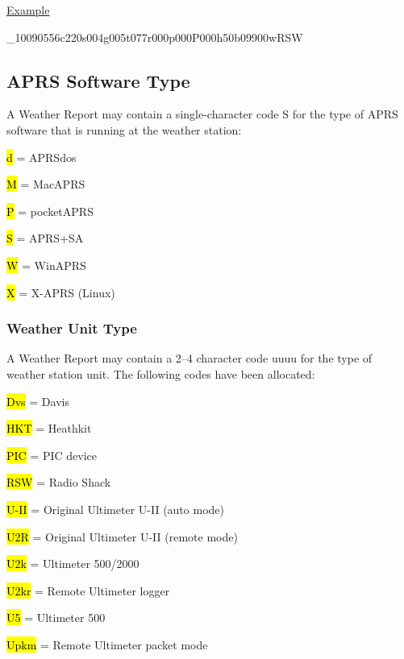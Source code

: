 \underline{Example}

\begin{description}
\item [Report derived from Radio Shack WX station data:]
\item \_10090556c220s004g005t077r000p000P000h50b09900wRSW 
\end{description}


\subsection {APRS Software Type}

A Weather Report may contain a single-character code S for the type of
APRS software that is running at the weather station:


\begin{description}
\item \hl{d} = APRSdos
\item \hl{M} = MacAPRS
\item \hl{P} = pocketAPRS
\item \hl{S} = APRS+SA
\item \hl{W} = WinAPRS
\item \hl{X} = X-APRS (Linux)
\end{description}

\subsubsection {Weather Unit Type}

A Weather Report may contain a 2–4 character code uuuu for the type of
weather station unit. The following codes have been allocated:

\begin{description}
\item \hl{Dvs} = Davis
\item \hl{HKT} = Heathkit
\item \hl{PIC} = PIC device
\item \hl{RSW} = Radio Shack
\item \hl{U-II} = Original Ultimeter U-II (auto mode)
\item \hl{U2R} = Original Ultimeter U-II (remote mode)
\item \hl{U2k} = Ultimeter 500/2000
\item \hl{U2kr} = Remote Ultimeter logger
\item \hl{U5} = Ultimeter 500
\item \hl{Upkm} = Remote Ultimeter packet mode
\end{description}

